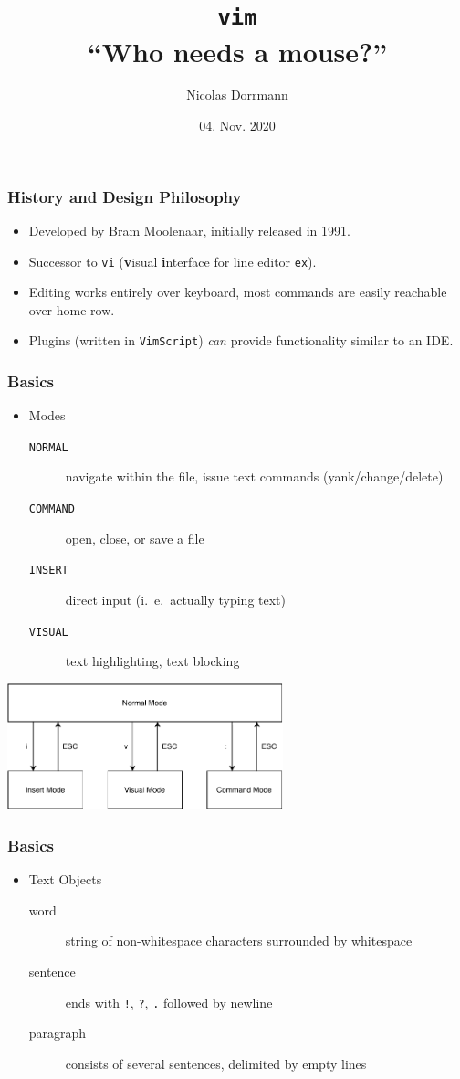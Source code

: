 \documentclass{beamer}
\title{\Huge\texttt{vim} \\ \normalsize ``Who needs a mouse?''}
\author{Nicolas Dorrmann}
\date{04. Nov. 2020}
\begin{document}
\frame{\titlepage}

\begin{frame}
    \frametitle{History and Design Philosophy}
    \begin{itemize}
        \item Developed by Bram Moolenaar, initially released in 1991.
        \item Successor to \texttt{vi} (\textbf{v}isual \textbf{i}nterface for line editor \texttt{ex}).
        \item Editing works entirely over keyboard, most commands are easily reachable over home row.
        \item Plugins (written in \texttt{VimScript}) \textit{can} provide functionality similar to an IDE.
    \end{itemize}
\end{frame}
\begin{frame}
    \frametitle{Basics}
    \begin{itemize}
        \item Modes
            \begin{description}
                \item [\texttt{NORMAL}]  navigate within the file, issue text commands (yank/change/delete)
                \item [\texttt{COMMAND}] open, close, or save a file
                \item [\texttt{INSERT}]  direct input (i.\ e.\ actually typing text)
                \item [\texttt{VISUAL}]  text highlighting, text blocking
            \end{description}
    \end{itemize}
    \vspace{0.5cm}
    \begin{center}
        \includegraphics[width=0.6\textwidth]{vim_modes.pdf}
    \end{center}
\end{frame}
\begin{frame}
    \frametitle{Basics}
    \begin{itemize}
        \item Text Objects
            \begin{description}
                \item [word]      string of non-whitespace characters surrounded by whitespace
                \item [sentence]  ends with \texttt{!}, \texttt{?}, \texttt{.} followed by newline
                \item [paragraph] consists of several sentences, delimited by empty lines
            \end{description}
    \end{itemize}
\end{frame}
\end{document}

